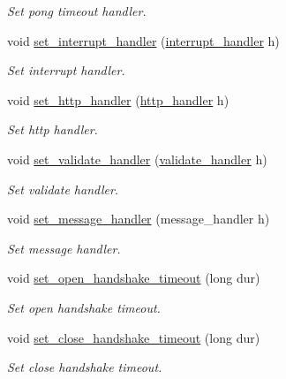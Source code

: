 \begin{DoxyCompactItemize}
\begin{DoxyCompactList}\small\item\em Set pong timeout handler. \end{DoxyCompactList}\item 
void \hyperlink{classwebsocketpp_1_1connection_aa8edc6e8ea1b72f84973bed0a20ad365}{set\+\_\+interrupt\+\_\+handler} (\hyperlink{namespacewebsocketpp_a55f6947df7673a9de3c44b6bd5d4a82a}{interrupt\+\_\+handler} h)
\begin{DoxyCompactList}\small\item\em Set interrupt handler. \end{DoxyCompactList}\item 
void \hyperlink{classwebsocketpp_1_1connection_a78c680623660b0442394af6b45c46c23}{set\+\_\+http\+\_\+handler} (\hyperlink{namespacewebsocketpp_a37bc4d5b3b21d3bb494d8a23236315d2}{http\+\_\+handler} h)
\begin{DoxyCompactList}\small\item\em Set http handler. \end{DoxyCompactList}\item 
void \hyperlink{classwebsocketpp_1_1connection_aa28096d051f5639d7b01954845fc054c}{set\+\_\+validate\+\_\+handler} (\hyperlink{namespacewebsocketpp_ae28f3fed86a59b1998746694f3d4edbd}{validate\+\_\+handler} h)
\begin{DoxyCompactList}\small\item\em Set validate handler. \end{DoxyCompactList}\item 
void \hyperlink{classwebsocketpp_1_1connection_a107e754227c828582779b906654743fe}{set\+\_\+message\+\_\+handler} (message\+\_\+handler h)
\begin{DoxyCompactList}\small\item\em Set message handler. \end{DoxyCompactList}\item 
void \hyperlink{classwebsocketpp_1_1connection_ad5a666fe1144dc68b1bae3bcc615e1ed}{set\+\_\+open\+\_\+handshake\+\_\+timeout} (long dur)
\begin{DoxyCompactList}\small\item\em Set open handshake timeout. \end{DoxyCompactList}\item 
void \hyperlink{classwebsocketpp_1_1connection_a3bf932388a128a7b719c45b945bffaad}{set\+\_\+close\+\_\+handshake\+\_\+timeout} (long dur)
\begin{DoxyCompactList}\small\item\em Set close handshake timeout. \end{DoxyCompactList}\item 

\end{DoxyCompactItemize}
